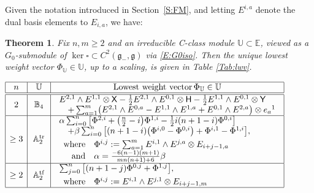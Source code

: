 \documentclass[pdftex]{sigma}%
\newcommand\tensor{\otimes}
\DeclareMathOperator{\tf}{tf}
\DeclareMathOperator{\tr}{tr}
\newcommand\fg{\mathfrak{g}}
\newcommand\bbE{\mathbb{E}}
\newcommand\bbU{\mathbb{U}}
\newcommand\bbA{\mathbb{A}}
\newcommand\bbB{\mathbb{B}}
\newcommand\sfX{\mathsf{X}}
\newcommand\sfH{\mathsf{H}}
\newcommand\sfY{\mathsf{Y}}
\numberwithin{equation}{section}
\newtheorem{Theorem}{Theorem}[section]
\begin{document}
 Given the notation introduced in Section~\ref{S:FM}, and letting $E^{i,a}$ denote the dual basis elements to $E_{i,a}$, we have:

\begin{Theorem}\label{T:lwv}
Fix $n,m \geq 2$ and an irreducible C-class module $\bbU \subset \bbE$, viewed as a $G_0$-submodule of $\ker\square \subset C^2(\fg_-,\fg)$ via \eqref{E:G0iso}. Then the unique lowest weight vector $\Phi_\bbU \in \bbU$, up to a scaling, is given in Table {\rm \ref{Tab:lwv}}.
\end{Theorem}
\begin{table}[h]\renewcommand{\arraystretch}{1.3}
\centering
$\begin{array}{|c|c|l|}\hline
n & \begin{array}{c}
\bbU\end{array}& \multicolumn{1}{c|}{\text{Lowest weight vector}\, \Phi_\bbU \in \bbU} \\\hline\hline
2 & \bbB_4 & \begin{array}{l}
E^{2,1} \wedge E^{1,1} \tensor \sfX -\frac{1}{2}E^{2,1} \wedge E^{0,1} \tensor \sfH -\frac{1}{2}E^{1,1} \wedge E^{0,1} \tensor \sfY \\ \quad + \sum_{a=1}^m \bigl(E^{2,1} \wedge E^{0,a} - E^{1,1} \wedge E^{1,a} + E^{0,1} \wedge E^{2,a} \bigr)\tensor e_a{}^1
\end{array} \\\hline
\ge 3 & \bbA_2^{\tr}&
 \begin{array}{l}
 \alpha \sum_{i=0}^n\big[\Phi^{2,i} + \bigl(\frac{n}{2}-i\bigr)\Phi^{1,i}-\frac{1}{2}i(n+1-i)\Phi^{0,i}\big] \\
\quad + \beta\sum_{i=0}^n \big[(n+1-i)\bigl(\Phi^{i,0}-\Phi^{0,i}\bigr) + \Phi^{i,1}-\Phi^{1,i}\big],\\[0.05in]
 \begin{array}{rl}
 \text{where} & \Phi^{i,j} := \sum_{a=1}^m E^{i,1}\wedge E^{j,a}\tensor E_{i+j-1,a}\\
 \text{and} & \alpha = \frac{-6(n-1)(m+1)}{mn(n+1)+6}\beta
 \end{array}
\end{array}
\\\hline
 \ge 2 & \bbA_2^{\tf}&
 \begin{array}{l}
 \sum_{j=0}^n\big[(n+1-j)\Phi^{0,j} + \Phi^{1,j}\big],\\[0.05in]
 \begin{array}{rl}
 \text{where} & \Phi^{i,j} := E^{i,1}\wedge E^{j,1}\tensor E_{i+j-1,m}
 \end{array}
 \end{array} \\ \hline
\end{array}$
\caption{Classification of lowest weight vectors $\Phi_{\bbU}$ for irreducible C-class modules $\bbU \subset \bbE$.}
\label{Tab:lwv}
\end{table}
\end{document}
